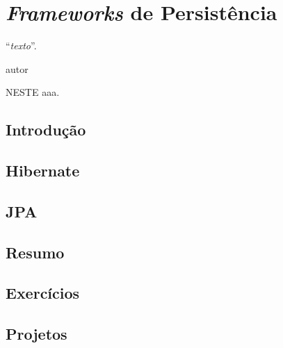 \chapter{\textit{Frameworks} de Persistência}\label{cap:frameworksPersistencia}
\epigraph{``\textit{texto}''.}{autor}

\lettrine[lines=4, lhang=0.1, lraise=0, loversize=0.2, findent=0.1em]{\textcolor{corAzulTema}{N}}{ESTE} aaa.

\section{Introdução}

\section{Hibernate}

\section{JPA}

\section{Resumo}

\section{Exercícios}

\section{Projetos}
